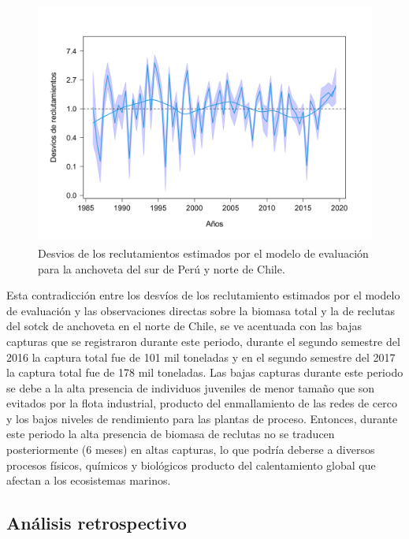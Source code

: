 \documentclass[letter,11pt]{article}
\begin{document}
\vspace{0.5cm}
\begin{figure}[htb!]
 \centering
 \includegraphics[width=12cm,height=8cm]{fig/figura06.pdf}
 \caption{Desvios de los reclutamientos estimados por el modelo de evaluaci\'on para la 
 anchoveta del sur de Per\'u y norte de Chile.}
 \label{Fig06}
\end{figure}
\vspace{0.5cm}



Esta contradicci\'on entre los desv\'ios de los reclutamiento estimados por el modelo de evaluaci\'on
y las observaciones directas sobre la biomasa total y la de reclutas del sotck de anchoveta en el norte
de Chile, se ve acentuada con las bajas capturas que se registraron durante este periodo, durante el segundo semestre del 2016 la captura total fue de 101 mil toneladas y en el segundo semestre
del 2017 la captura total fue de 178 mil toneladas. Las bajas capturas durante este periodo se debe 
a la alta presencia de individuos juveniles de menor tamaño que son evitados por la flota industrial,
producto del enmallamiento de las redes de cerco y los bajos niveles de rendimiento para las plantas de
proceso. Entonces, durante este periodo la alta presencia de biomasa de reclutas no se traducen
posteriormente (6 meses) en altas capturas, lo que podr\'ia deberse a diversos procesos f\'isicos, qu\'imicos y biol\'ogicos producto del calentamiento global que afectan a los ecosistemas marinos. \\


\subsection{An\'alisis retrospectivo}
\end{document}
